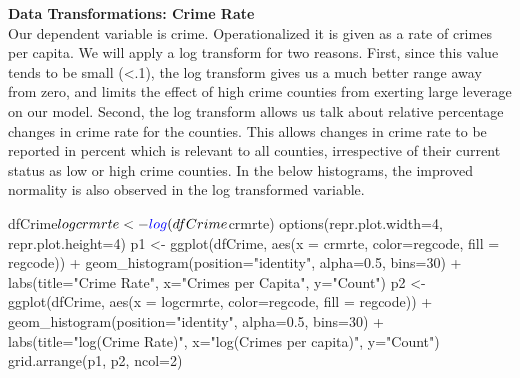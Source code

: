\documentclass[]{article}
\newenvironment{Shaded}{}{}
\newcommand{\DataTypeTok}[1]{#1}
\newcommand{\DecValTok}[1]{#1}
\newcommand{\FloatTok}[1]{#1}
\newcommand{\KeywordTok}[1]{\textcolor[rgb]{0.00,0.00,1.00}{#1}}
\newcommand{\NormalTok}[1]{#1}
\newcommand{\OperatorTok}[1]{#1}
\newcommand{\StringTok}[1]{\textcolor[rgb]{0.00,0.50,0.50}{#1}}
\begin{document}
\textbf{Data Transformations: Crime Rate}\\
Our dependent variable is crime. Operationalized it is given as a rate
of crimes per capita. We will apply a log transform for two reasons.
First, since this value tends to be small (\textless{}.1), the log
transform gives us a much better range away from zero, and limits the
effect of high crime counties from exerting large leverage on our model.
Second, the log transform allows us talk about relative percentage
changes in crime rate for the counties. This allows changes in crime
rate to be reported in percent which is relevant to all counties,
irrespective of their current status as low or high crime counties. In
the below histograms, the improved normality is also observed in the log
transformed variable.

\begin{Shaded}
\begin{Highlighting}[]
\NormalTok{dfCrime}\OperatorTok{$}\NormalTok{logcrmrte <-}\StringTok{ }\KeywordTok{log}\NormalTok{(dfCrime}\OperatorTok{$}\NormalTok{crmrte)}
\KeywordTok{options}\NormalTok{(}\DataTypeTok{repr.plot.width=}\DecValTok{4}\NormalTok{, }\DataTypeTok{repr.plot.height=}\DecValTok{4}\NormalTok{)}
\NormalTok{p1 <-}\StringTok{ }\KeywordTok{ggplot}\NormalTok{(dfCrime, }\KeywordTok{aes}\NormalTok{(}\DataTypeTok{x =}\NormalTok{ crmrte, }\DataTypeTok{color=}\NormalTok{regcode, }\DataTypeTok{fill =}\NormalTok{ regcode)) }\OperatorTok{+}
\StringTok{  }\KeywordTok{geom_histogram}\NormalTok{(}\DataTypeTok{position=}\StringTok{"identity"}\NormalTok{, }\DataTypeTok{alpha=}\FloatTok{0.5}\NormalTok{, }\DataTypeTok{bins=}\DecValTok{30}\NormalTok{) }\OperatorTok{+}
\StringTok{  }\KeywordTok{labs}\NormalTok{(}\DataTypeTok{title=}\StringTok{"Crime Rate"}\NormalTok{, }\DataTypeTok{x=}\StringTok{"Crimes per Capita"}\NormalTok{, }\DataTypeTok{y=}\StringTok{"Count"}\NormalTok{)}
\NormalTok{p2 <-}\StringTok{ }\KeywordTok{ggplot}\NormalTok{(dfCrime, }\KeywordTok{aes}\NormalTok{(}\DataTypeTok{x =}\NormalTok{ logcrmrte, }\DataTypeTok{color=}\NormalTok{regcode, }\DataTypeTok{fill =}\NormalTok{ regcode)) }\OperatorTok{+}
\StringTok{  }\KeywordTok{geom_histogram}\NormalTok{(}\DataTypeTok{position=}\StringTok{"identity"}\NormalTok{, }\DataTypeTok{alpha=}\FloatTok{0.5}\NormalTok{, }\DataTypeTok{bins=}\DecValTok{30}\NormalTok{) }\OperatorTok{+}
\StringTok{  }\KeywordTok{labs}\NormalTok{(}\DataTypeTok{title=}\StringTok{"log(Crime Rate)"}\NormalTok{, }\DataTypeTok{x=}\StringTok{"log(Crimes per capita)"}\NormalTok{, }\DataTypeTok{y=}\StringTok{"Count"}\NormalTok{)}
\KeywordTok{grid.arrange}\NormalTok{(p1, p2, }\DataTypeTok{ncol=}\DecValTok{2}\NormalTok{)}
\end{Highlighting}
\end{Shaded}
\end{document}
